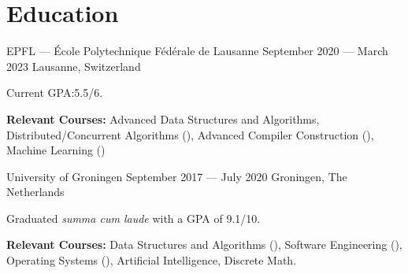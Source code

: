 \section*{Education}

\begin{cventries}
{EPFL --- École Polytechnique Fédérale de Lausanne} %
{September 2020 --- March 2023} %
{Lausanne, Switzerland} %
{%
  \begin{cvitems}
    \item Current GPA:\@ 5.5/6.
    \item \textbf{Relevant Courses:} Advanced Data Structures and Algorithms, Distributed/Concurrent Algorithms (), Advanced Compiler Construction (), Machine Learning ()
  \end{cvitems}
}
{University of Groningen}  %
{September 2017 --- July 2020} %
{Groningen, The Netherlands} %
{%
  \begin{cvitems}
    \item Graduated \textit{summa cum laude} with a GPA of 9.1/10.
    \item \textbf{Relevant Courses:} Data Structures and Algorithms (), Software Engineering (), Operating Systems (), Artificial Intelligence,  Discrete Math.
  \end{cvitems}
}
\end{cventries}
